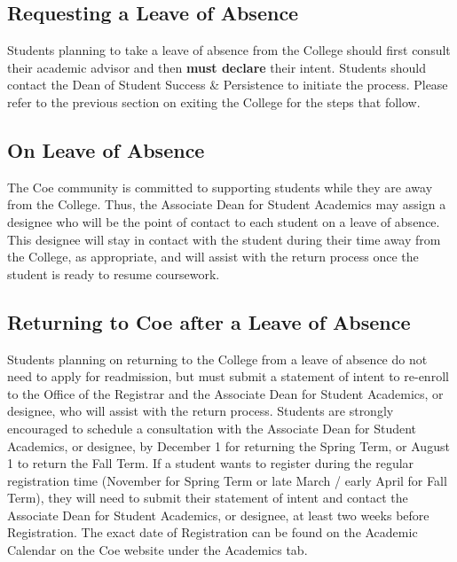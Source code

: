 \documentclass[
  letterpaper,
]{scrbook}
\begin{document}
\subsection{Requesting a Leave of
Absence}\label{requesting-a-leave-of-absence}

Students planning to take a leave of absence from the College should
first consult their academic advisor and then \textbf{must declare}
their intent. Students should contact the Dean of Student Success \&
Persistence to initiate the process. Please refer to the previous
section on exiting the College for the steps that follow.

\subsection{On Leave of Absence}\label{on-leave-of-absence}

The Coe community is committed to supporting students while they are
away from the College. Thus, the Associate Dean for Student Academics
may assign a designee who will be the point of contact to each student
on a leave of absence. This designee will stay in contact with the
student during their time away from the College, as appropriate, and
will assist with the return process once the student is ready to resume
coursework.

\subsection{Returning to Coe after a Leave of
Absence}\label{returning-to-coe-after-a-leave-of-absence}

Students planning on returning to the College from a leave of absence do
not need to apply for readmission, but must submit a statement of intent
to re-enroll to the Office of the Registrar and the Associate Dean for
Student Academics, or designee, who will assist with the return process.
Students are strongly encouraged to schedule a consultation with the
Associate Dean for Student Academics, or designee, by December 1 for
returning the Spring Term, or August 1 to return the Fall Term. If a
student wants to register during the regular registration time (November
for Spring Term or late March / early April for Fall Term), they will
need to submit their statement of intent and contact the Associate Dean
for Student Academics, or designee, at least two weeks before
Registration. The exact date of Registration can be found on the
Academic Calendar on the Coe website under the Academics tab.
\end{document}
